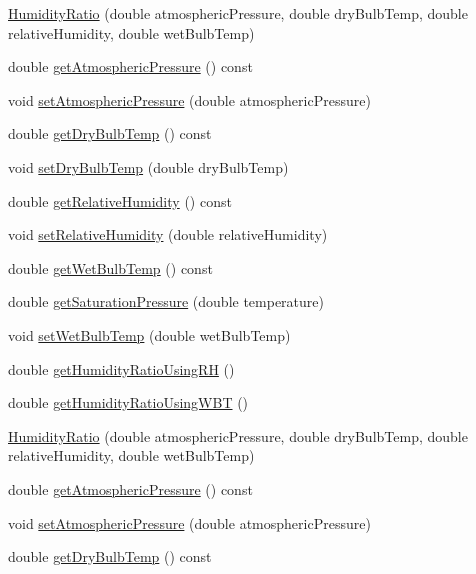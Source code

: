 \begin{DoxyCompactItemize}
\hyperlink{class_humidity_ratio_a504da4363c7291a09107360de2ee709a}{Humidity\+Ratio} (double atmospheric\+Pressure, double dry\+Bulb\+Temp, double relative\+Humidity, double wet\+Bulb\+Temp)
\item 
double \hyperlink{class_humidity_ratio_a7814687795a87a3822e4584773938741}{get\+Atmospheric\+Pressure} () const
\item 
void \hyperlink{class_humidity_ratio_aebab92be0c5eb4f23baaeb7268dad87e}{set\+Atmospheric\+Pressure} (double atmospheric\+Pressure)
\item 
double \hyperlink{class_humidity_ratio_a737b2faf32e5271b8062b175e1d018a9}{get\+Dry\+Bulb\+Temp} () const
\item 
void \hyperlink{class_humidity_ratio_a291bccce6b8665412987a31bd2633d9a}{set\+Dry\+Bulb\+Temp} (double dry\+Bulb\+Temp)
\item 
double \hyperlink{class_humidity_ratio_af761b52e96bdf995e1a2bbbfd9e3b47f}{get\+Relative\+Humidity} () const
\item 
void \hyperlink{class_humidity_ratio_a110aecb6587a836ab76d4aca840e5759}{set\+Relative\+Humidity} (double relative\+Humidity)
\item 
double \hyperlink{class_humidity_ratio_adbadf93878e4867ce283319859d04087}{get\+Wet\+Bulb\+Temp} () const
\item 
double \hyperlink{class_humidity_ratio_a29d3152c2f14fd47f9ee34c0787049cf}{get\+Saturation\+Pressure} (double temperature)
\item 
void \hyperlink{class_humidity_ratio_a5bda925f783cb4cef848245b00e28e29}{set\+Wet\+Bulb\+Temp} (double wet\+Bulb\+Temp)
\item 
double \hyperlink{class_humidity_ratio_af711463f09fa91544c2b69dc24817fed}{get\+Humidity\+Ratio\+Using\+RH} ()
\item 
double \hyperlink{class_humidity_ratio_ad33fa981783bae96c17171f12b9cf2bd}{get\+Humidity\+Ratio\+Using\+W\+BT} ()
\item 
\hyperlink{class_humidity_ratio_a504da4363c7291a09107360de2ee709a}{Humidity\+Ratio} (double atmospheric\+Pressure, double dry\+Bulb\+Temp, double relative\+Humidity, double wet\+Bulb\+Temp)
\item 
double \hyperlink{class_humidity_ratio_a7814687795a87a3822e4584773938741}{get\+Atmospheric\+Pressure} () const
\item 
void \hyperlink{class_humidity_ratio_aebab92be0c5eb4f23baaeb7268dad87e}{set\+Atmospheric\+Pressure} (double atmospheric\+Pressure)
\item 
double \hyperlink{class_humidity_ratio_a737b2faf32e5271b8062b175e1d018a9}{get\+Dry\+Bulb\+Temp} () const

\end{DoxyCompactItemize}
